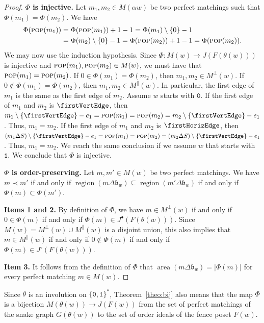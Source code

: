 \documentclass[a4paper,12pt]{amsart}
\newcommand{\bfrak}{{\mathfrak{b}}}
\newcommand{\0}{\mathtt{0}}
\newcommand{\1}{\mathtt{1}}
\newcommand{\2}{\mathtt{2}}
\newcommand{\3}{\mathtt{3}}
\newcommand{\carreplein}{{\perp}}
\newcommand{\carrevide}{{\parallel}}
\DeclareMathOperator{\region}{region}
\DeclareMathOperator{\area}{area}
\DeclareMathOperator{\pop}{\textsc{pop}}
\newcommand{\size}[1]{
    {|#1|}                 %
}
\begin{document}
\begin{proof}
    \textbf{$\Phi$ is injective.}
    Let $m_1,m_2\in M(\alpha w)$ be two perfect matchings such that $\Phi(m_1)=\Phi(m_2)$.
    We have
    \begin{align*}
        \Phi(\pop(m_1))
        &=\Phi(\pop(m_1))+1-1
        =\Phi(m_1)\setminus\{0\}-1\\
        &=\Phi(m_2)\setminus\{0\}-1
        =\Phi(\pop(m_2))+1-1
        =\Phi(\pop(m_2)).
    \end{align*}
    We may now use the induction hypothesis.
    Since $\Phi:M(w)\to J(F(\theta(w)))$ is injective
    and $\pop(m_1),\pop(m_2)\in M(w)$,
    we must have that $\pop(m_1)=\pop(m_2)$.
    If $0\in \Phi(m_1) =\Phi(m_2)$,
    then $m_1,m_2\in M^\carreplein(w)$.
    If $0\notin \Phi(m_1) =\Phi(m_2)$,
    then $m_1,m_2\in M^\carrevide(w)$.
    In particular, the first edge of $m_1$ is the same as
    the first edge of $m_2$.
    Assume $w$ starts with $\0$.
    If the first edge of $m_1$ and $m_2$ is $\firstVertEdge$, then
    $m_1\setminus\{\firstVertEdge\}-e_1
    =\pop(m_1)
    =\pop(m_2)
    =m_2\setminus\{\firstVertEdge\}-e_1$.
    Thus, $m_1=m_2$.
    If the first edge of $m_1$ and $m_2$ is $\firstHorizEdge$, then
    $(m_1\Delta S)\setminus\{\firstVertEdge\}-e_1
    =\pop(m_1)
    =\pop(m_2)
    =(m_2\Delta S)\setminus\{\firstVertEdge\}-e_1$.
    Thus, $m_1=m_2$.
    We reach the same conclusion if we assume $w$ that starts with $\1$.
    We conclude that $\Phi$ is injective.

    \textbf{$\Phi$ is order-preserving.}
    Let $m, m'\in M(w)$ be two perfect matchings.
    We have
    $m\prec m'$
    if and only if
    $\region(m \Delta \bfrak_w)
    \subseteq
    \region(m' \Delta \bfrak_w)$
    if and only if
    $\Phi(m)\subset\Phi(m')$.

    \textbf{Items 1 and 2.}
    By definition of $\Phi$, we have
    $m\in M^\carreplein(w)$
    if and only if $0\in\Phi(m)$
    if and only if $\Phi(m)\in J^\bullet(F(\theta(w)))$.
    Since $M(w)=M^\carreplein(w)\cup M^\carrevide(w)$ is a disjoint union,
    this also implies that
    $m\in M^\carrevide(w)$
    if and only if $0\notin\Phi(m)$
    if and only if $\Phi(m)\in J^\circ(F(\theta(w)))$.

    \textbf{Item 3.}
    It follows from the definition of $\Phi$
    that $\area(m\Delta\bfrak_w) = \size{\Phi(m)}$
    for every perfect matching $m\in M(w)$.
\end{proof}

Since $\theta$ is an involution on $\{\0,\1\}^*$,
Theorem~\ref{theo:bij}
also means that the map $\Phi$
is a bijection $M(\theta(w))\to J(F(w))$
from
the set of perfect matchings of the snake graph $G(\theta(w))$
to the set of order ideals of the fence poset $F(w)$.
\end{document}

